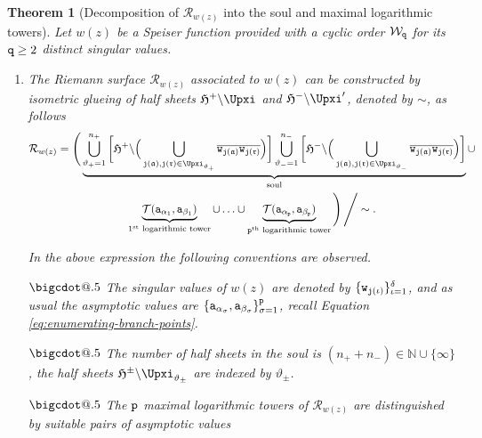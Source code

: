 \documentclass[final,3p,times]{elsarticle}
\makeatletter
\newcommand{\NN}{\ensuremath{{\mathbb N}}}
\newcommand{\R}{\ensuremath{{\mathcal R}}}
\newcommand{\msigma}{\ensuremath{{\mathfrak{a}}}}
\newcommand{\mrho}{\ensuremath{{\mathfrak{r}}}}
\newcommand*\bigcdot{\mathpalette\bigcdot@{.5}}
\newcommand*\bigcdot@[2]{\mathbin{\vcenter{\hbox{\scalebox{#2}{$\m@th#1\bullet$}}}}}
\newtheorem{theorem}{Theorem}[section]
\theoremstyle{definition}
\makeatother
\begin{document}
\begin{theorem}[Decomposition of $\R_{w(z)}$ into the soul and maximal logarithmic towers]
\label{theo:decomposition-soul-logtowers}
Let $w(z)$ be a  Speiser function 
provided with a cyclic order $\mathcal{W}_{\tt q}$ 
for its ${\tt q}\geq 2$ distinct singular values.
\begin{enumerate}[label=\arabic*),leftmargin=*]

\item 
The Riemann surface $\R_{w(z)}$ associated to $w(z)$ can be constructed by 
isometric glueing of 
half sheets 
$\mathfrak{H}^+\backslash\Upxi$ and 
$\mathfrak{H}^-\backslash\Upxi^\prime$,
denoted by $\sim$,  as follows
\begin{multline}
\label{eq:descomposicion-Rw}
\R_{w(z)} = 
\Bigg(
\underbrace{
\bigcup_{{\vartheta_+} =1}^{n_+} 
\bigg[
\mathfrak{H}^+\backslash \Big(\bigcup\limits_{
{\tt j}( \msigma ) , {\tt j}( \mrho ) \in  \Upxi_{\vartheta_+} 
} 
\overline{ {\tt w}_{{\tt j}( \msigma )} 
{\tt w}_{{\tt j}( \mrho )} } \Big)
\bigg]%
\bigcup_{{\vartheta_-} =1}^{n_-}
\bigg[
\mathfrak{H}^-\backslash \Big(\bigcup\limits_{
{\tt j}( \msigma ) , {\tt j}( \mrho ) \in  \Upxi_{\vartheta_-} 
} 
\overline{ {\tt w}_{{\tt j}( \msigma )} 
{\tt w}_{{\tt j}( \mrho )} } \Big)
\bigg]%
}_{\text{soul}}
\cup
\\ 
\underbrace{
\mathcal{T}({\tt a}_{\alpha_1}, {\tt a}_{\beta_1})
}_{1^{\text{st}} \text{ logarithmic tower}} 
\cup
\ldots 
\cup
\underbrace{ 
\mathcal{T} ( {\tt a}_{\alpha_{\tt p}}, {\tt a}_{\beta_{\tt p}} )
}_{ {\tt p}^{\text{th}} \text{ logarithmic tower}} 
\Bigg) \, \Bigg/ \sim .
\end{multline}


\noindent
In the above expression the following conventions are observed.

\noindent
$\bigcdot$
The singular values 
of $w(z)$
are denoted by $ \{{\tt w}_{{\tt j} (\iota) } \}_{\iota=1}^\delta $, and as usual
the asymptotic values are $\{ {\tt a}_{\alpha_\sigma} , {\tt a}_{\beta_\sigma} \}_{\sigma=1}^{\tt p}$,
recall
Equation \eqref{eq:enumerating-branch-points}.

\noindent
$\bigcdot$
The number of half sheets in the soul is 
$(n_+ + n_-) \in \NN \cup\{\infty\}
$, 
the half sheets $\mathfrak{H}^\pm \backslash\Upxi_{\vartheta_\pm}$ 
are indexed by $\vartheta_\pm$.


\noindent
$\bigcdot$
The $\tt p$ maximal logarithmic towers 
of $\R_{w(z)}$ 
are distinguished by suitable pairs of 
asymptotic values 


\end{enumerate}
\end{theorem}
\end{document}
